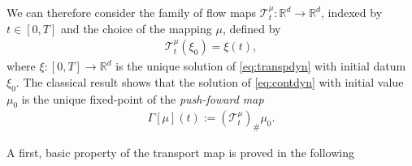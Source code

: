 \documentclass[A4paper,11pt]{article}
\theoremstyle{definition}
\newcommand{\R}{\mathbb{R}}
\begin{document}
We can therefore consider the family of flow maps $\mathcal{T}^{\mu}_t:\R^d \rightarrow\R^d$, indexed by $t \in [0,T]$ and the choice of the mapping $\mu$, defined by
\begin{align*}
\mathcal{T}^{\mu}_t(\xi_0) = \xi(t),
\end{align*}
where $\xi:[0,T]\rightarrow\R^d$ is the unique solution of \eqref{eq:transpdyn} with initial datum $\xi_0$. The classical result \cite[Theorem 3.10]{CanCarRos10} shows that the solution of \eqref{eq:contdyn} with initial value $\mu_0$ is the unique fixed-point of the \textit{push-foward map}
\begin{align}\label{eq:fixedpoint}
\Gamma[\mu](t) := (\mathcal{T}^{\mu}_t)_{\#}\mu_0.
\end{align}

A first, basic property of the transport map is proved in the following
\end{document}
